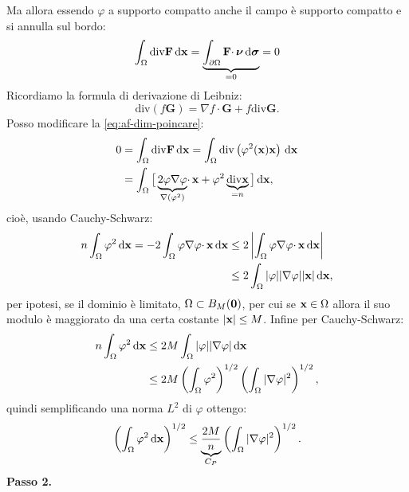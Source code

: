 \begin{dimostrazione}
    Ma allora essendo $\varphi $ a supporto compatto anche il campo è supporto compatto e si annulla sul bordo:
    \begin{equation}
        \int _{\Omega }\mathrm{div}\mathbf{F} \,\mathrm d \mathbf{x} =\underbrace{\int _{\partial \Omega }\mathbf{F} \cdotp \bm{\nu }\,\mathrm d \bm{\sigma} }_{=0} =0
        \label{eq:af-dim-poincare}
    \end{equation}
    Ricordiamo la formula di derivazione di Leibniz:
    \begin{equation*}
        \mathrm{div}(f\mathbf{G}) =\nabla f\cdotp \mathbf{G} +f\mathrm{div}\mathbf{G} .
    \end{equation*}
    Posso modificare la \eqref{eq:af-dim-poincare}:
    \begin{align*}
        0 & =\int _{\Omega }\mathrm{div}\mathbf{F} \,\mathrm d \mathbf{x} =\int _{\Omega }\mathrm{div}\left(\varphi ^{2}(\mathbf{x})\mathbf{x}\right) \,\mathrm d \mathbf{x}                                                      \\
          & =\int _{\Omega }\big[\underbrace{2\varphi \nabla \varphi }_{\nabla \left(\varphi ^{2}\right)} \cdotp \mathbf{x} +\varphi ^{2}\underbrace{\mathrm{div}\mathbf{x}}_{=n}\big] \,\mathrm d \mathbf{x} ,
    \end{align*}
    cioè, usando Cauchy-Schwarz:
    \begin{align*}
        n\int _{\Omega } \varphi ^{2} \,\mathrm d \mathbf{x} =-2\int _{\Omega } \varphi \nabla \varphi \cdotp \mathbf{x} \,\mathrm d \mathbf{x} & \leq 2\left| \int _{\Omega } \varphi \nabla \varphi \cdotp \mathbf{x} \,\mathrm d \mathbf{x}\right| \\
                                                                                                    & \leq 2\int _{\Omega }| \varphi | | \nabla \varphi | | \mathbf{x}| \,\mathrm d \mathbf{x} ,
    \end{align*}
    per ipotesi, se il dominio è limitato, $\displaystyle \Omega \subset B_{M}(\mathbf{0})$, per cui se $\displaystyle \mathbf{x} \in \Omega $ allora il suo modulo è maggiorato da una certa costante $\displaystyle | \mathbf{x}| \leq M$. Infine per Cauchy-Schwarz:
    \begin{align*}
        n\int _{\Omega } \varphi ^{2} \,\mathrm d \mathbf{x} & \leq 2M\int _{\Omega }| \varphi | | \nabla \varphi | \,\mathrm d \mathbf{x}                                                         \\
                                           & \leq 2M\left(\int _{\Omega } \varphi ^{2}\right)^{1/2}\left(\int _{\Omega }| \nabla \varphi | ^{2}\right)^{1/2} ,
    \end{align*}
    quindi semplificando una norma $\displaystyle L^{2}$ di $\displaystyle \varphi $ ottengo:
    \begin{equation*}
        \left(\int _{\Omega } \varphi ^{2} \,\mathrm d \mathbf{x}\right)^{1/2} \leq \underbrace{\frac{2M}{n}}_{C_{P}}\left(\int _{\Omega }| \nabla \varphi | ^{2}\right)^{1/2} .
    \end{equation*}
    \textbf{Passo 2.}


\end{dimostrazione}
